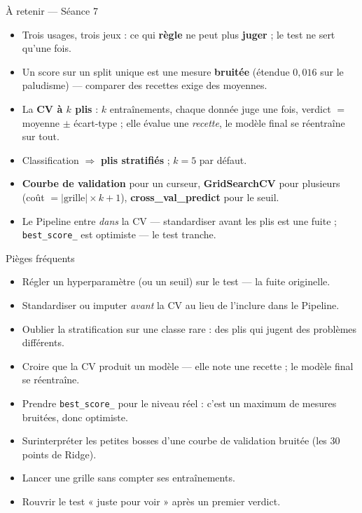 \documentclass[aspectratio=169,11pt]{beamer}
\begin{document}
\begin{frame}{À retenir — Séance 7}
\begin{ucadret}[L'essentiel]
\begin{itemize}\small
  \item Trois usages, trois jeux : ce qui \textbf{règle} ne peut plus \textbf{juger} ; le test ne sert qu'une fois.
  \item Un score sur un split unique est une mesure \textbf{bruitée} (étendue $0{,}016$ sur le paludisme) — comparer des recettes exige des moyennes.
  \item La \textbf{CV à $k$ plis} : $k$ entraînements, chaque donnée juge une fois, verdict $=$ moyenne $\pm$ écart-type ; elle évalue une \emph{recette}, le modèle final se réentraîne sur tout.
  \item Classification $\Rightarrow$ \textbf{plis stratifiés} ; $k = 5$ par défaut.
  \item \textbf{Courbe de validation} pour un curseur, \textbf{GridSearchCV} pour plusieurs (coût $= |\text{grille}| \times k + 1$), \textbf{cross\_val\_predict} pour le seuil.
  \item Le Pipeline entre \emph{dans} la CV — standardiser avant les plis est une fuite ; \texttt{best\_score\_} est optimiste — le test tranche.
\end{itemize}
\end{ucadret}
\end{frame}

\begin{frame}{Pièges fréquents}
\begin{itemize}\small
  \item Régler un hyperparamètre (ou un seuil) sur le test — la fuite originelle.
  \item Standardiser ou imputer \emph{avant} la CV au lieu de l'inclure dans le Pipeline.
  \item Oublier la stratification sur une classe rare : des plis qui jugent des problèmes différents.
  \item Croire que la CV produit un modèle — elle note une recette ; le modèle final se réentraîne.
  \item Prendre \texttt{best\_score\_} pour le niveau réel : c'est un maximum de mesures bruitées, donc optimiste.
  \item Surinterpréter les petites bosses d'une courbe de validation bruitée (les $30$ points de Ridge).
  \item Lancer une grille sans compter ses entraînements.
  \item Rouvrir le test « juste pour voir » après un premier verdict.
\end{itemize}
\end{frame}
\end{document}
